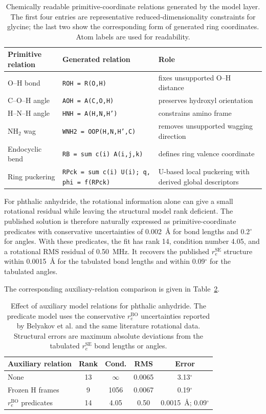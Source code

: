 \documentclass[aip,jcp,reprint,longbibliography,floatfix]{revtex4-2}
\begin{document}
\begin{table}[t]
\caption{Chemically readable primitive-coordinate relations generated by the
model layer. The first four entries are representative reduced-dimensionality
constraints for glycine; the last two show the corresponding form of generated
ring coordinates. Atom labels are used for readability.}
\label{tab:generated-relation-example}
\scriptsize
\setlength{\tabcolsep}{4pt}
\begin{tabular}{@{}lll@{}}
\toprule
Primitive relation & Generated relation & Role \\
\midrule
O--H bond & \texttt{ROH = R(O,H)} & fixes unsupported O--H distance \\
C--O--H angle & \texttt{AOH = A(C,O,H)} & preserves hydroxyl orientation \\
H--N--H angle & \texttt{HNH = A(H,N,H')} & constrains amino frame \\
NH$_2$ wag & \texttt{WNH2 = OOP(H,N,H',C)} & removes unsupported wagging direction \\
Endocyclic bend & \texttt{RB = sum c(i) A(i,j,k)} & defines ring valence coordinate \\
Ring puckering & \texttt{RPck = sum c(i) U(i); q, phi = f(RPck)} & U-based local puckering with derived global descriptors \\
\bottomrule
\end{tabular}
\end{table}

For phthalic anhydride, the rotational information alone can give a small
rotational residual while leaving the structural model rank deficient. The
published solution is therefore naturally expressed as primitive-coordinate
predicates with conservative uncertainties of 0.002~\AA{} for bond lengths and
0.2$^\circ$ for angles. With these predicates, the fit has
rank 14, condition number 4.05, and a rotational RMS residual of 0.50~MHz. It
recovers the published $r_e^\mathrm{SE}$ structure within 0.0015~\AA{} for the
tabulated bond lengths and within 0.09$^\circ$ for the tabulated angles.

The corresponding auxiliary-relation comparison is given in
Table~\ref{tab:phthalic-predicates}.

\begin{table}[t]
\caption{Effect of auxiliary model relations for phthalic anhydride. The
predicate model uses the conservative $r_e^\mathrm{BO}$ uncertainties reported
by Belyakov et al. and the same literature rotational data. Structural errors are
maximum absolute deviations from the tabulated $r_e^\mathrm{SE}$ bond lengths or angles.}
\label{tab:phthalic-predicates}
\scriptsize
\setlength{\tabcolsep}{2.5pt}
\begin{tabular}{lcccc}
\toprule
Auxiliary relation & Rank & Cond. & RMS & Error \\
\midrule
None & 13 & $\infty$ & 0.0065 & 3.13$^\circ$ \\
Frozen H frames & 9 & 1056 & 0.0067 & 0.19$^\circ$ \\
$r_e^\mathrm{BO}$ predicates & 14 & 4.05 & 0.50 & 0.0015~\AA; 0.09$^\circ$ \\
\bottomrule
\end{tabular}
\end{table}
\end{document}

